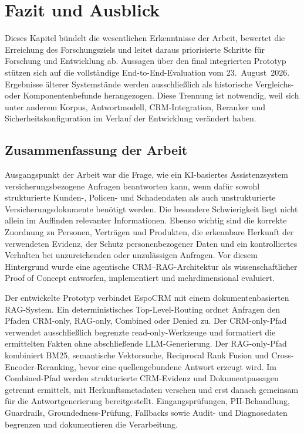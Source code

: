 \chapter{Fazit und Ausblick}

Dieses Kapitel bündelt die wesentlichen Erkenntnisse der Arbeit, bewertet die Erreichung des Forschungsziels und leitet daraus priorisierte Schritte für Forschung und Entwicklung ab. Aussagen über den final integrierten Prototyp stützen sich auf die vollständige End-to-End-Evaluation vom 23.~August~2026. Ergebnisse älterer Systemstände werden ausschließlich als historische Vergleichs- oder Komponentenbefunde herangezogen. Diese Trennung ist notwendig, weil sich unter anderem Korpus, Antwortmodell, CRM-Integration, Reranker und Sicherheitskonfiguration im Verlauf der Entwicklung verändert haben.

\section{Zusammenfassung der Arbeit}

Ausgangspunkt der Arbeit war die Frage, wie ein KI-basiertes Assistenzsystem versicherungsbezogene Anfragen beantworten kann, wenn dafür sowohl strukturierte Kunden-, Policen- und Schadendaten als auch unstrukturierte Versicherungsdokumente benötigt werden. Die besondere Schwierigkeit liegt nicht allein im Auffinden relevanter Informationen. Ebenso wichtig sind die korrekte Zuordnung zu Personen, Verträgen und Produkten, die erkennbare Herkunft der verwendeten Evidenz, der Schutz personenbezogener Daten und ein kontrolliertes Verhalten bei unzureichenden oder unzulässigen Anfragen. Vor diesem Hintergrund wurde eine agentische CRM--RAG-Architektur als wissenschaftlicher Proof of Concept entworfen, implementiert und mehrdimensional evaluiert.

Der entwickelte Prototyp verbindet EspoCRM mit einem dokumentenbasierten RAG-System. Ein deterministisches Top-Level-Routing ordnet Anfragen den Pfaden CRM-only, RAG-only, Combined oder Denied zu. Der CRM-only-Pfad verwendet ausschließlich begrenzte read-only-Werkzeuge und formatiert die ermittelten Fakten ohne abschließende LLM-Generierung. Der RAG-only-Pfad kombiniert BM25, semantische Vektorsuche, Reciprocal Rank Fusion und Cross-Encoder-Reranking, bevor eine quellengebundene Antwort erzeugt wird. Im Combined-Pfad werden strukturierte CRM-Evidenz und Dokumentpassagen getrennt ermittelt, mit Herkunftsmetadaten versehen und erst danach gemeinsam für die Antwortgenerierung bereitgestellt. Eingangsprüfungen, PII-Behandlung, Guardrails, Groundedness-Prüfung, Fallbacks sowie Audit- und Diagnosedaten begrenzen und dokumentieren die Verarbeitung.

